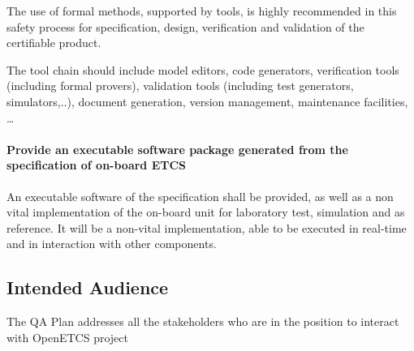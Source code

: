 \documentclass{template/openetcs_article}
\begin{document}
The use of formal methods, supported by tools, is highly recommended in this safety process for specification, design, verification and validation of the certifiable product.

The tool chain should include model editors, code generators, verification tools (including formal provers), validation tools (including test generators, simulators,..), document generation, version management, maintenance facilities, \dots

\paragraph{Provide an executable software package generated from the specification of on-board ETCS}

An executable software of the specification shall be provided, as well as a non vital implementation of the on-board unit for laboratory test, simulation and as reference. It will be a non-vital  implementation, able to be executed in real-time and in interaction with other components.


\subsection{Intended Audience}

The QA Plan addresses all the stakeholders who are in the position to interact with OpenETCS project
\end{document}
